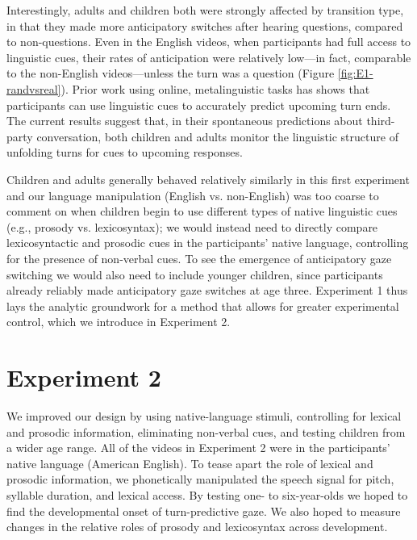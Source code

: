 \documentclass[authoryear, 12pt]{elsarticle}
\begin{document}
Interestingly, adults and children both were strongly affected by transition type, in that they made more anticipatory switches after hearing questions, compared to non-questions. Even in the English videos, when participants had full access to linguistic cues, their rates of anticipation were relatively low---in fact, comparable to the non-English videos---unless the turn was a question (Figure \ref{fig:E1-randvsreal}). Prior work using online, metalinguistic tasks has shows that participants can use linguistic cues to accurately predict upcoming turn ends. The current results suggest that, in their spontaneous predictions about third-party conversation, both children and adults monitor the linguistic structure of unfolding turns for cues to upcoming responses.

Children and adults generally behaved relatively similarly in this first experiment and our language manipulation (English vs. non-English) was too coarse to comment on when children begin to use different types of native linguistic cues (e.g., prosody vs. lexicosyntax); we would instead need to directly compare lexicosyntactic and prosodic cues in the participants' native language, controlling for the presence of non-verbal cues. To see the emergence of anticipatory gaze switching we would also need to include younger children, since participants already reliably made anticipatory gaze switches at age three. Experiment 1 thus lays the analytic groundwork for a method that allows for greater experimental control, which we introduce in Experiment 2. 

\section{Experiment 2}
\label{sec:exp2}

We improved our design by using native-language stimuli, controlling for lexical and prosodic information, eliminating non-verbal cues, and testing children from a wider age range. All of the videos in Experiment 2 were in the participants' native language (American English). To tease apart the role of lexical and prosodic information, we phonetically manipulated the speech signal for pitch, syllable duration, and lexical access. By testing one- to six-year-olds we hoped to find the developmental onset of turn-predictive gaze. We also hoped to measure changes in the relative roles of prosody and lexicosyntax across development.
\end{document}
